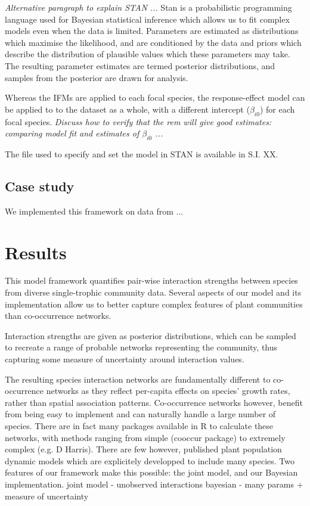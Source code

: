 \documentclass[a4,12pt]{article}
\begin{document}
        \textit{Alternative paragraph to explain STAN ...}
        Stan is a probabilistic programming language used for Bayesian statistical inference which allows us to fit complex models even when the data is limited. Parameters are estimated as distributions which maximise the likelihood, and are conditioned by the data and priors which describe the distribution of plausible values which these parameters may take. The resulting parameter estimates are termed posterior distributions, and samples from the posterior are drawn for analysis.
        
        Whereas the IFMs are applied to each focal species, the response-effect model can be applied to to the dataset as a whole, with a different intercept ($\beta_{i0}$) for each focal species. \textit{Discuss how to verify that the rem will give good estimates: comparing model fit and estimates of $\beta_{i0}$ ...}

        The file used to specify and set the model in STAN is available in S.I. XX. 
    
        \subsection{Case study}

        We implemented this framework on data from ...
        

    \section{Results}


    This model framework quantifies pair-wise interaction strengths between species from diverse single-trophic community data. Several aspects of our model and its implementation allow us to better capture complex features of plant communities than co-occurrence networks. 

    Interaction strengths are given as posterior distributions, which can be sampled to recreate a range of probable networks representing the community, thus capturing some measure of uncertainty around interaction values. 

    The resulting species interaction networks are fundamentally different to co-occurrence networks as they reflect per-capita effects on species' growth rates, rather than spatial association patterns. 
    Co-occurrence networks however, benefit from being easy to implement and can naturally handle a large number of species. There are in fact many  packages available in R to calculate these networks, with methods ranging from simple (cooccur package) to extremely complex (e.g. D Harris). 
    There are few however, published plant population dynamic models which are explicitely developped to include many species. Two features of our framework make this possible: the joint model, and our Bayesian implementation.
    joint model - unobserved interactions 
    bayesian - many params + measure of uncertainty
\end{document}
